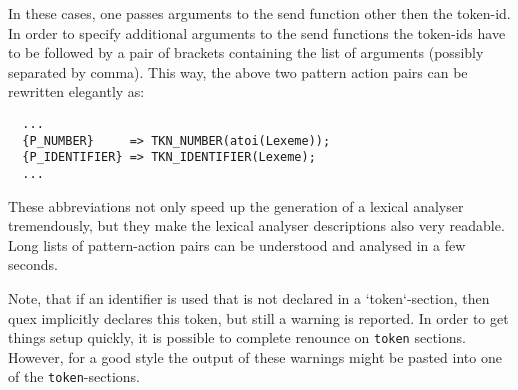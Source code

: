 In these cases, one passes arguments to the send function other then the
token-id. In order to specify additional arguments to the send functions the
token-ids have to be followed by a pair of brackets containing the list of
arguments (possibly separated by comma). This way, the above two pattern
action pairs can be rewritten elegantly as:

\begin{lstlisting}
  ...
  {P_NUMBER}     => TKN_NUMBER(atoi(Lexeme));
  {P_IDENTIFIER} => TKN_IDENTIFIER(Lexeme); 
  ...
\end{lstlisting}

These abbreviations not only speed up the generation of a lexical analyser
tremendously, but they make the lexical analyser descriptions also very
readable. Long lists of pattern-action pairs can be understood and
analysed in a few seconds.

Note, that if an identifier is used that is not declared in a `token`-section, 
    then quex implicitly declares this token, but still a warning is reported.
In order to get things setup quickly, it is possible to complete renounce on
{\tt token} sections. However, for a good style the output of these warnings
might be pasted into one of the {\tt token}-sections.
